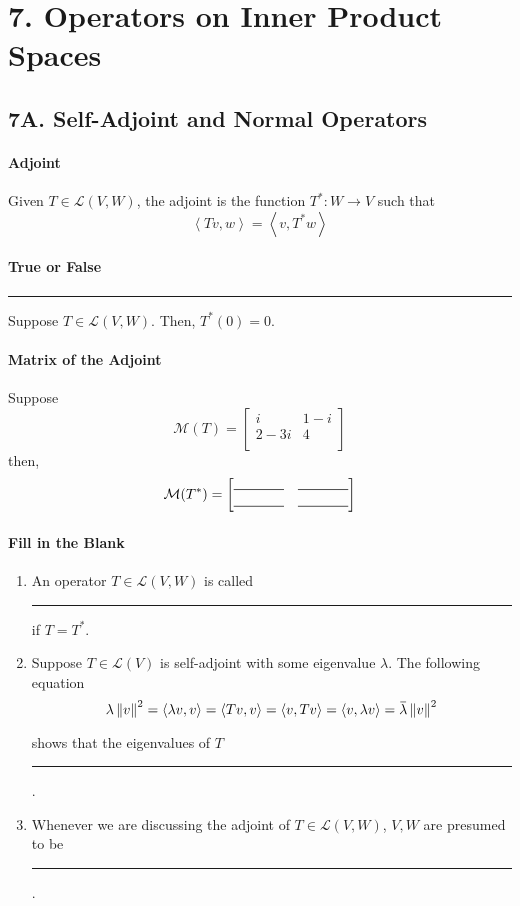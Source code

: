 \documentclass{article}
\newcommand{\norm}[1]{\left\lVert#1\right\rVert}
\newcommand{\iprod}[2]{\left\langle#1,#2\right\rangle}
\newcommand{\overbar}[1]{\mkern 1.5mu\overline{\mkern-1.5mu#1\mkern-1.5mu}\mkern 1.5mu}
\newcommand{\blank}[1]{\rule[0ex]{#1in}{0.5pt}}
\begin{document}
\section*{7. Operators on Inner Product Spaces}
\subsection*{7A. Self-Adjoint and Normal Operators}
\paragraph{Adjoint} Given $T \in \mathcal{L}(V, W)$, the adjoint is the function $T^*: W \rightarrow V$ such that
\[\iprod{Tv}{w} = \iprod{v}{T^*w}\]

\paragraph{True or False} \blank{0.5} Suppose $T \in \mathcal{L}(V, W)$. Then, $T^*(0) = 0$.

\paragraph{Matrix of the Adjoint}
Suppose 
\[\mathcal{M}(T) = 
\begin{bmatrix}
    i & 1-i \\
    2 - 3i & 4\\
\end{bmatrix}
\]
then,
\[\mathcal{M}(T^*) = 
\begin{bmatrix}
    \blank{0.5} & \blank{0.5} \\
    \blank{0.5} & \blank{0.5} \\
\end{bmatrix}
\]

\paragraph{Fill in the Blank}
\begin{enumerate}
    \item An operator $T \in \mathcal{L}(V, W)$ is called
    \blank{2} if $T = T^*$.
    
    \item Suppose $T \in \mathcal{L}(V)$ is self-adjoint with some  eigenvalue $\lambda$. The following equation
    \[
        \lambda \norm{v}^2 = \iprod{\lambda v}{v} = 
        \iprod{Tv}{v} = \iprod{v}{Tv} = \iprod{v}{\lambda v}
        = \overbar{\lambda}\norm{v}^2
    \]
    
    shows that the eigenvalues of $T$ \blank{3}.
    
    
    \item  Whenever we are discussing the adjoint of $T \in \mathcal{L}(V, W)$, $V, W$ are presumed to be
    
    \blank{2}.
\end{enumerate}
\end{document}
